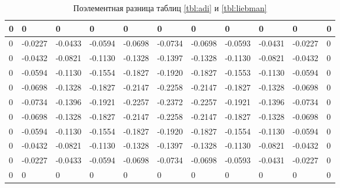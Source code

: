 \documentclass[12pt, a4paper]{article}
\begin{document}
\begin{table}[ht]
	\small
	\caption{Поэлементная разница таблиц \ref{tbl:adi} и \ref{tbl:liebman}}
	\label{tbl:diff12}
	\begin{tabular}{|l|l|l|l|l|l|l|l|l|l|l|}
		\hline
		0 & 0       & 0       & 0       & 0       & 0       & 0       & 0       & 0       & 0       & 0 \\ \hline
		0 & -0.0227 & -0.0433 & -0.0594 & -0.0698 & -0.0734 & -0.0698 & -0.0593 & -0.0431 & -0.0227 & 0 \\ \hline
		0 & -0.0432 & -0.0821 & -0.1130 & -0.1328 & -0.1397 & -0.1328 & -0.1130 & -0.0821 & -0.0432 & 0 \\ \hline
		0 & -0.0594 & -0.1130 & -0.1554 & -0.1827 & -0.1920 & -0.1827 & -0.1553 & -0.1130 & -0.0594 & 0 \\ \hline
		0 & -0.0698 & -0.1328 & -0.1827 & -0.2147 & -0.2258 & -0.2147 & -0.1827 & -0.1328 & -0.0698 & 0 \\ \hline
		0 & -0.0734 & -0.1396 & -0.1921 & -0.2257 & -0.2372 & -0.2257 & -0.1921 & -0.1396 & -0.0734 & 0 \\ \hline
		0 & -0.0698 & -0.1328 & -0.1827 & -0.2147 & -0.2258 & -0.2147 & -0.1827 & -0.1328 & -0.0698 & 0 \\ \hline
		0 & -0.0594 & -0.1130 & -0.1554 & -0.1827 & -0.1920 & -0.1827 & -0.1554 & -0.1130 & -0.0594 & 0 \\ \hline
		0 & -0.0432 & -0.0821 & -0.1130 & -0.1328 & -0.1397 & -0.1328 & -0.1130 & -0.0821 & -0.0432 & 0 \\ \hline
		0 & -0.0227 & -0.0433 & -0.0594 & -0.0698 & -0.0734 & -0.0698 & -0.0593 & -0.0431 & -0.0227 & 0 \\ \hline
		0 & 0       & 0       & 0       & 0       & 0       & 0       & 0       & 0       & 0       & 0 \\ \hline
	\end{tabular}
\end{table}
\end{document}
